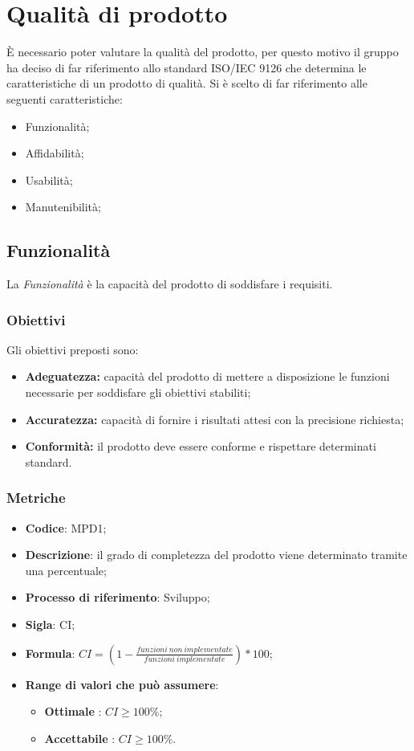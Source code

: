 \section{Qualità di prodotto}
È necessario poter valutare la qualità del prodotto, per questo motivo il gruppo \Omicron{} ha deciso di far riferimento allo standard ISO/IEC 9126 che determina le caratteristiche di un prodotto di qualità. Si è scelto di far riferimento alle seguenti caratteristiche:
\begin {itemize}
	\item{Funzionalità;}
	\item{Affidabilità;}
	\item{Usabilità;}
	\item{Manutenibilità;}
\end{itemize}

\subsection{Funzionalità}
La \textit{Funzionalità} è la capacità del prodotto di soddisfare i requisiti.
\subsubsection{Obiettivi}
Gli obiettivi preposti sono:
\begin {itemize}
	\item \textbf{Adeguatezza:} capacità del prodotto di mettere a disposizione le funzioni necessarie per soddisfare gli obiettivi stabiliti;
	\item \textbf{Accuratezza:} capacità di fornire i risultati attesi con la precisione richiesta;
	\item \textbf{Conformità:} il prodotto deve essere conforme e rispettare determinati standard.
\end{itemize}
\subsubsection{Metriche}
\vspace{-1cm}
\begin{itemize}
	\item \textbf{Codice}: MPD1;
	\item \textbf{Descrizione}: il grado di completezza del prodotto viene determinato tramite una percentuale;
	\item \textbf{Processo di riferimento}: Sviluppo;
	\item \textbf{Sigla}: CI;
	\item \textbf{Formula}: \begin{math}CI=\left(1-\frac{funzioni \ non \ implementate}{funzioni \ implementate}\right)*100\end{math};
	\item \textbf{Range di valori che può assumere}: 
		\begin{itemize}
			\item \textbf{Ottimale} : $CI \geq 100 \%$;
			\item \textbf{Accettabile} : $CI \geq 100 \%$.
		\end{itemize}
\end{itemize}

